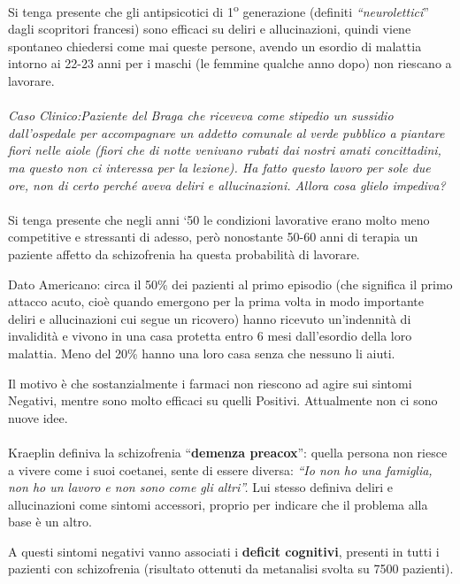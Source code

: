 Si tenga presente che gli antipsicotici di 1\textsuperscript{o} generazione (definiti
\emph{``neurolettici}'' dagli scopritori francesi) sono efficaci su
deliri e allucinazioni, quindi viene spontaneo chiedersi come mai queste
persone, avendo un esordio di malattia intorno ai 22-23 anni per i
maschi (le femmine qualche anno dopo) non riescano a lavorare.
\\\\
\emph{\emph{Caso Clinico:Paziente del Braga che riceveva come stipedio
un sussidio dall'ospedale per accompagnare un addetto comunale al verde
pubblico a piantare fiori nelle aiole (fiori che di notte venivano
rubati dai nostri amati concittadini, ma questo non ci interessa per la
lezione). Ha fatto questo lavoro per sole due ore, non di certo perché
aveva deliri e allucinazioni. Allora cosa glielo impediva?}}
\\\\
Si tenga presente che negli anni `50 le condizioni lavorative erano
molto meno competitive e stressanti di adesso, però nonostante 50-60
anni di terapia un paziente affetto da schizofrenia ha questa
probabilità di lavorare.

Dato Americano: circa il 50\% dei pazienti al primo episodio (che
significa il primo attacco acuto, cioè quando emergono per la prima
volta in modo importante deliri e allucinazioni cui segue un ricovero)
hanno ricevuto un'indennità di invalidità e vivono in una casa protetta
entro 6 mesi dall'esordio della loro malattia. Meno del 20\% hanno una
loro casa senza che nessuno li aiuti.

Il motivo è che sostanzialmente i farmaci non riescono ad agire sui
sintomi Negativi, mentre sono molto efficaci su quelli Positivi.
Attualmente non ci sono nuove idee.
\\\\
Kraeplin definiva la schizofrenia ``\textbf{demenza preacox}'': quella
persona non riesce a vivere come i suoi coetanei, sente di essere
diversa: \emph{``Io non ho una famiglia, non ho un lavoro e non sono
come gli altri''.} Lui stesso definiva deliri e allucinazioni come
sintomi accessori, proprio per indicare che il problema alla base è un
altro.

A questi sintomi negativi vanno associati i \textbf{deficit cognitivi},
presenti in tutti i pazienti con schizofrenia (risultato ottenuti da
metanalisi svolta su 7500 pazienti).

